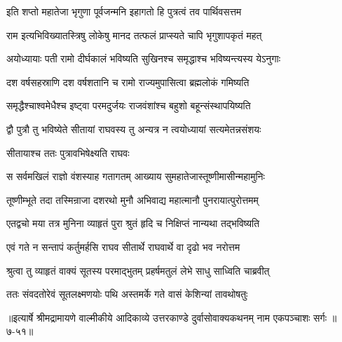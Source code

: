 \twolineshloka
{इति शप्तो महातेजा भृगुणा पूर्वजन्मनि}
{इहागतो हि पुत्रत्वं तव पार्थिवसत्तम} %

\twolineshloka
{राम इत्यभिविख्यातस्त्रिषु लोकेषु मानद}
{तत्फलं प्राप्स्यते चापि भृगुशापकृतं महत्} %

\twolineshloka
{अयोध्यायाः पती रामो दीर्घकालं भविष्यति}
{सुखिनश्च समृद्धाश्च भविष्यन्त्यस्य येऽनुगाः} %

\twolineshloka
{दश वर्षसहस्राणि दश वर्षशतानि च}
{रामो राज्यमुपासित्वा ब्रह्मलोकं गमिष्यति} %

\twolineshloka
{समृद्धैश्चाश्वमेधैश्च इष्ट्वा परमदुर्जयः}
{राजवंशांश्च बहुशो बहून्संस्थापयिष्यति} %

\twolineshloka
{द्वौ पुत्रौ तु भविष्येते सीतायां राघवस्य तु}
{अन्यत्र न त्वयोध्यायां सत्यमेतन्नसंशयः} %

\onelineshloka
{सीतायाश्च ततः पुत्रावभिषेक्ष्यति राघवः} %

\twolineshloka
{स सर्वमखिलं राज्ञो वंशस्याह गतागतम्}
{आख्याय सुमहातेजास्तूष्णीमासीन्महामुनिः} %

\twolineshloka
{तूष्णीम्भूते तदा तस्मिन्राजा दशरथो मुनौ}
{अभिवाद्य महात्मानौ पुनरायात्पुरोत्तमम्} %

\twolineshloka
{एतद्वचो मया तत्र मुनिना व्याहृतं पुरा}
{श्रुतं हृदि च निक्षिप्तं नान्यथा तद्भविष्यति} %

\twolineshloka
{एवं गते न सन्तापं कर्तुमर्हसि राघव}
{सीतार्थे राघवार्थे वा दृढो भव नरोत्तम} %

\twolineshloka
{श्रुत्वा तु व्याहृतं वाक्यं सूतस्य परमाद्भुतम्}
{प्रहर्षमतुलं लेभे साधु साध्विति चाब्रवीत्} %

\twolineshloka
{ततः संवदतोरेवं सूतलक्ष्मणयोः पथि}
{अस्तमर्के गते वासं केशिन्यां तावथोषतुः} %


॥इत्यार्षे श्रीमद्रामायणे वाल्मीकीये आदिकाव्ये उत्तरकाण्डे दुर्वासोवाक्यकथनम् नाम एकपञ्चाशः सर्गः ॥७-५१॥
